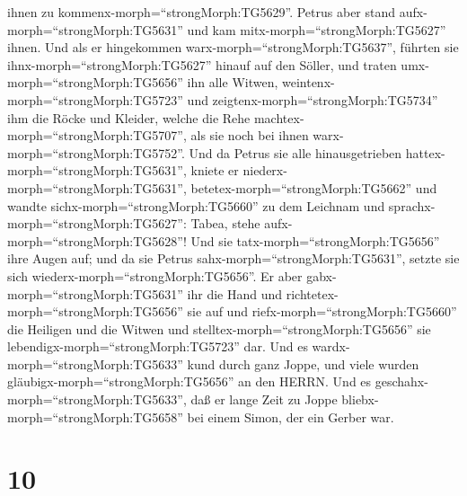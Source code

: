 ihnen zu kommenx-morph=``strongMorph:TG5629''.  Petrus aber
stand aufx-morph=``strongMorph:TG5631'' und kam
mitx-morph=``strongMorph:TG5627'' ihnen. Und als er hingekommen
warx-morph=``strongMorph:TG5637'', führten sie
ihnx-morph=``strongMorph:TG5627'' hinauf auf den Söller, und traten
umx-morph=``strongMorph:TG5656'' ihn alle Witwen,
weintenx-morph=``strongMorph:TG5723'' und
zeigtenx-morph=``strongMorph:TG5734'' ihm die Röcke und Kleider, welche
die Rehe machtex-morph=``strongMorph:TG5707'', als sie noch bei ihnen
warx-morph=``strongMorph:TG5752''.  Und da Petrus sie alle
hinausgetrieben hattex-morph=``strongMorph:TG5631'', kniete er
niederx-morph=``strongMorph:TG5631'',
betetex-morph=``strongMorph:TG5662'' und wandte
sichx-morph=``strongMorph:TG5660'' zu dem Leichnam und
sprachx-morph=``strongMorph:TG5627'': Tabea, stehe
aufx-morph=``strongMorph:TG5628''! Und sie
tatx-morph=``strongMorph:TG5656'' ihre Augen auf; und da sie Petrus
sahx-morph=``strongMorph:TG5631'', setzte sie sich
wiederx-morph=``strongMorph:TG5656''.  Er aber
gabx-morph=``strongMorph:TG5631'' ihr die Hand und
richtetex-morph=``strongMorph:TG5656'' sie auf und
riefx-morph=``strongMorph:TG5660'' die Heiligen und die Witwen und
stelltex-morph=``strongMorph:TG5656'' sie
lebendigx-morph=``strongMorph:TG5723'' dar.  Und es
wardx-morph=``strongMorph:TG5633'' kund durch ganz Joppe, und viele
wurden gläubigx-morph=``strongMorph:TG5656'' an den HERRN. 
Und es geschahx-morph=``strongMorph:TG5633'', daß er lange Zeit zu Joppe
bliebx-morph=``strongMorph:TG5658'' bei einem Simon, der ein Gerber war.

\hypertarget{section-9}{%
\section{10}\label{section-9}}

